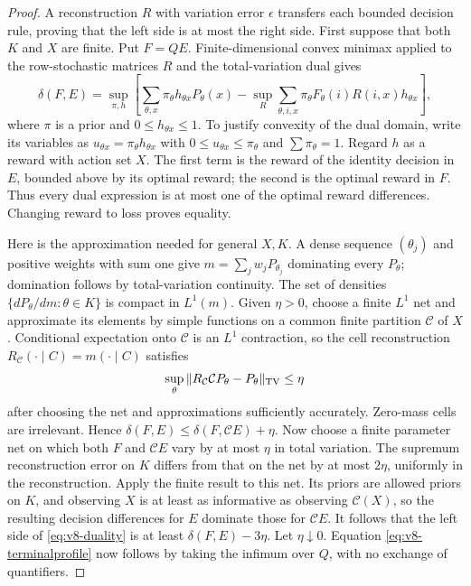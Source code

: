 \begin{proof}
A reconstruction $R$ with variation error $\epsilon$ transfers each
bounded decision rule, proving that the left side is at most the right
side. First suppose that both $K$ and $X$ are finite. Put $F=QE$.
Finite-dimensional convex minimax applied to the row-stochastic matrices
$R$ and the total-variation dual gives
\[
 \delta(F,E)=\sup_{\pi,h}\left[
 \sum_{\theta,x}\pi_\theta h_{\theta x}P_\theta(x)
 -\sup_R\sum_{\theta,i,x}\pi_\theta F_\theta(i)
                         R(i,x)h_{\theta x}\right],
\]
where $\pi$ is a prior and $0\le h_{\theta x}\le1$. To justify convexity
of the dual domain, write its variables as
$u_{\theta x}=\pi_\theta h_{\theta x}$ with
$0\le u_{\theta x}\le\pi_\theta$ and $\sum\pi_\theta=1$.
Regard $h$ as a reward with action set $X$. The first term is the reward
of the identity decision in $E$, bounded above by its optimal reward;
the second is the optimal reward in $F$. Thus every dual expression is
at most one of the optimal reward differences. Changing reward to loss
proves equality.

Here is the approximation needed for general $X,K$. A dense sequence
$(\theta_j)$ and positive weights with sum one give
$m=\sum_jw_jP_{\theta_j}$ dominating every $P_\theta$; domination follows
by total-variation continuity. The set of densities
$\{dP_\theta/dm:\theta\in K\}$ is compact in $L^1(m)$. Given $\eta>0$,
choose a finite $L^1$ net and approximate its elements by simple
functions on a common finite partition $\mathcal C$ of $X$. Conditional
expectation onto $\mathcal C$ is an $L^1$ contraction, so the cell
reconstruction $R_{\mathcal C}(\cdot\mid C)=m(\cdot\mid C)$ satisfies
\[
 \sup_\theta\|R_{\mathcal C}\mathcal C P_\theta-P_\theta\|_{\rm TV}
 \le\eta
\]
after choosing the net and approximations sufficiently accurately.
Zero-mass cells are irrelevant. Hence
$\delta(F,E)\le\delta(F,\mathcal CE)+\eta$.
Now choose a finite parameter net on which both $F$ and $\mathcal CE$
vary by at most $\eta$ in total variation. The supremum reconstruction
error on $K$ differs from that on the net by at most $2\eta$, uniformly
in the reconstruction. Apply the finite result to this net. Its priors
are allowed priors on $K$, and observing $X$ is at least as informative
as observing $\mathcal C(X)$, so the resulting decision differences for
$E$ dominate those for $\mathcal CE$. It follows that the left side of
\eqref{eq:v8-duality} is at least $\delta(F,E)-3\eta$. Let $\eta\downarrow0$.
Equation \eqref{eq:v8-terminalprofile} now follows by taking the infimum
over $Q$, with no exchange of quantifiers.
\end{proof}

